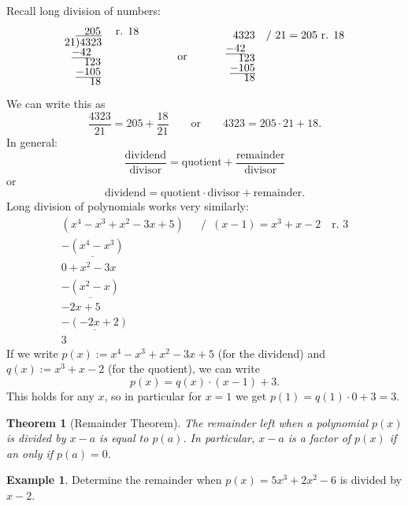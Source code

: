 \documentclass[
  english,
  12pt,
  oneside]{book}
\newtheorem{theorem}{Theorem}[chapter]
\theoremstyle{definition}
\theoremstyle{definition}
\newtheorem{example}{Example}[chapter]
\theoremstyle{definition}
\theoremstyle{definition}
\theoremstyle{remark}
\begin{document}
Recall long division of numbers:
\[\begin{array}{rl}
      205&\text{ r. }18 \\[-3pt]
   21 \overline{){4323}}\kern-.2ex \\[-3pt]
      \underline{-42}\phantom{m}\\[-3pt]
      123 \\[-3pt]
      \underline{-105}\\[-3pt]
      18
  \end{array}
  \quad\quad\quad\text{or}\quad\quad\quad
  \begin{array}{rl}
  4323& / \,\,21 = 205\text{ r. }18 \\
      \underline{-42}\phantom{m}\\[-3pt]
      123 \\[-3pt]
      \underline{-105}\\[-3pt]
      18
    \end{array}\]
We can write this as
\[\frac{4323}{21} = 205+\frac{18}{21}\quad\quad\text{or}\quad\quad
4323 = 205\cdot 21 + 18.\]
In general:
\[\frac{\text{dividend}}{\text{divisor}} = \text{quotient} + \frac{\text{remainder}}{\text{divisor}}\]
or
\[\text{dividend} = \text{quotient}\cdot\text{divisor} + \text{remainder}.\]
Long division of polynomials works very similarly:
\[\begin{array}{rl}
(x^4-x^3+x^2-3x+5)& / \,\,\, (x-1) = x^3+x-2\quad\text{r. }3\\
\underline{-(x^4 -x^3)}\phantom{+x^2-3x+5)}&\\
0+x^2-3x\phantom{+5x)}\\
\underline{-(x^2-x)}\phantom{+5x)}\\
-2x+5\phantom{m}\\
\underline{-(-2x+2)}\phantom{)}\\
3\phantom{m}
\end{array}\]
If we write \(p(x):=x^4-x^3+x^2-3x+5\) (for the dividend) and \(q(x):=x^3+x-2\) (for the quotient), we can write
\[p(x) = q(x)\cdot(x-1) + 3.\]
This holds for any \(x\), so in particular for \(x=1\) we get \(p(1) = q(1)\cdot0+3=3\).

\begin{theorem}[Remainder Theorem]
The remainder left when a polynomial \(p(x)\) is divided by \(x-a\) is equal to \(p(a)\). In particular, \(x-a\) is a factor of \(p(x)\) if an only if \(p(a)=0\).
\end{theorem}

\begin{example}
Determine the remainder when \(p(x)=5x^3+2x^2-6\) is divided by \(x-2\).
\end{example}
\end{document}
